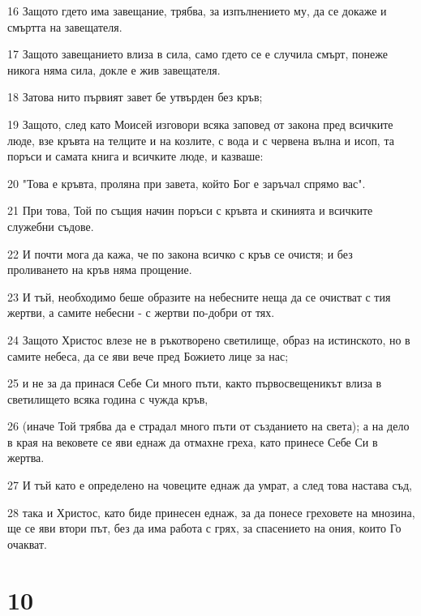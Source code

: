 \par 16 Защото гдето има завещание, трябва, за изпълнението му, да се докаже и смъртта на завещателя.
\par 17 Защото завещанието влиза в сила, само гдето се е случила смърт, понеже никога няма сила, докле е жив завещателя.
\par 18 Затова нито първият завет бе утвърден без кръв;
\par 19 Защото, след като Моисей изговори всяка заповед от закона пред всичките люде, взе кръвта на телците и на козлите, с вода и с червена вълна и исоп, та поръси и самата книга и всичките люде, и казваше:
\par 20 "Това е кръвта, проляна при завета, който Бог е заръчал спрямо вас".
\par 21 При това, Той по същия начин поръси с кръвта и скинията и всичките служебни съдове.
\par 22 И почти мога да кажа, че по закона всичко с кръв се очистя; и без проливането на кръв няма прощение.
\par 23 И тъй, необходимо беше образите на небесните неща да се очистват с тия жертви, а самите небесни - с жертви по-добри от тях.
\par 24 Защото Христос влезе не в ръкотворено светилище, образ на истинското, но в самите небеса, да се яви вече пред Божието лице за нас;
\par 25 и не за да принася Себе Си много пъти, както първосвещеникът влиза в светилището всяка година с чужда кръв,
\par 26 (иначе Той трябва да е страдал много пъти от създанието на света); а на дело в края на вековете се яви еднаж да отмахне греха, като принесе Себе Си в жертва.
\par 27 И тъй като е определено на човеците еднаж да умрат, а след това настава съд,
\par 28 така и Христос, като биде принесен еднаж, за да понесе греховете на мнозина, ще се яви втори път, без да има работа с грях, за спасението на ония, които Го очакват.

\chapter{10}


